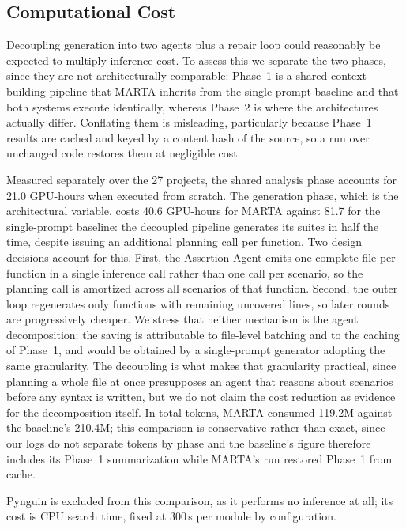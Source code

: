 \subsection{Computational Cost}

Decoupling generation into two agents plus a repair loop could reasonably be expected
to multiply inference cost. To assess this we separate the two phases, since they are
not architecturally comparable: Phase~1 is a shared context-building pipeline that
MARTA inherits from the single-prompt baseline and that both systems execute
identically, whereas Phase~2 is where the architectures actually differ. Conflating
them is misleading, particularly because Phase~1 results are cached and keyed by a
content hash of the source, so a run over unchanged code restores them at negligible
cost.

Measured separately over the 27 projects, the shared analysis phase accounts for
21.0 GPU-hours when executed from scratch. The generation phase, which is the
architectural variable, costs 40.6 GPU-hours for MARTA against 81.7 for the
single-prompt baseline: the decoupled pipeline generates its suites in half the time,
despite issuing an additional planning call per function. Two design decisions account
for this. First, the Assertion Agent emits one complete file per function in a single
inference call rather than one call per scenario, so the planning call is amortized
across all scenarios of that function. Second, the outer loop regenerates only
functions with remaining uncovered lines, so later rounds are progressively cheaper.
We stress that neither mechanism is the agent decomposition: the saving is attributable
to file-level batching and to the caching of Phase~1, and would be obtained by a
single-prompt generator adopting the same granularity. The decoupling is what makes
that granularity practical, since planning a whole file at once presupposes an agent
that reasons about scenarios before any syntax is written, but we do not claim the
cost reduction as evidence for the decomposition itself.
In total tokens, MARTA consumed 119.2M against the baseline's 210.4M; this comparison
is conservative rather than exact, since our logs do not separate tokens by phase and
the baseline's figure therefore includes its Phase~1 summarization while MARTA's run
restored Phase~1 from cache.

Pynguin is excluded from this comparison, as it performs no inference at all; its cost
is CPU search time, fixed at 300\,s per module by configuration.

